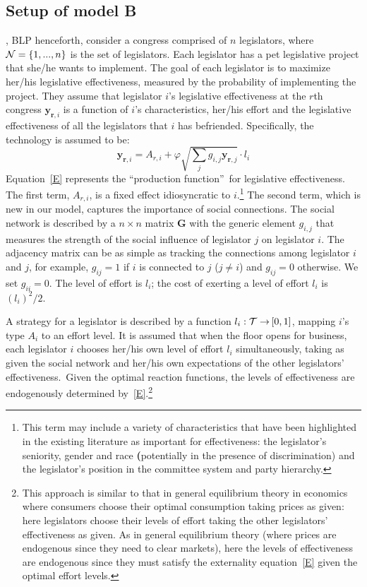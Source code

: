 \documentclass[nojss]{jss}
\begin{document}
\subsection{Setup of model B}\label{sec:modelB}

\cite{Battaglini+Sciabolazza+Patacchini:2020}, BLP henceforth, consider a congress comprised of $n$ legislators, where ${\cal N}=\{1,...,n\}$ is the set of legislators. Each legislator has a pet legislative project that she/he wants to implement. The goal of each legislator is to maximize her/his legislative effectiveness, measured by the probability of implementing the project. They assume that legislator $i$'s legislative effectiveness at the $r$th congress $\mathbf{y}_{\mathbf{r}, i}$ is a function of $i$'s characteristics, her/his effort and the legislative
effectiveness of all the legislators that $i$ has befriended. Specifically,
the technology is assumed to be:
\begin{equation}
	\mathbf{y}_{\mathbf{r}, i}=A_{r, i}+\varphi \sqrt{\sum_{j}g_{i,j}\mathbf{y}_{\mathbf{r}, j}}\cdot l_{i}
	\label{E}
\end{equation}
Equation~\ref{E} represents the \textquotedblleft production
function\textquotedblright\ for legislative effectiveness. The first term, $A_{r, i}$, is a fixed effect idiosyncratic to $i$.\footnote{This term may include a variety of characteristics that have been highlighted in the existing literature as important for effectiveness: the legislator's seniority, gender and race {\bf (}potentially in the presence of discrimination) and the legislator's position in the committee system and party hierarchy.} The second term, which is new in our model, captures
the importance of social connections. The social network is described by a $%
n\times n$ matrix $\boldsymbol{G}$ with the generic element $g_{i,j}$ that measures the
strength of the social influence of legislator $j$ on legislator $i$. The adjacency matrix can be as simple as tracking the connections among legislator $i$ and $j$, for example, $g_{ij}=1$ if $ i$ is connected to $j$ ($j\neq i$) and $g_{ij}=0$ otherwise. We set $g_{ii}=0$.
The level of effort is $l_{i}$; the cost of exerting a level of effort $l_{i}$
is $\left( l_{i}\right) ^{2}/2$.

A strategy for a legislator is described by a function $l_{i}:{\cal T\rightarrow }\left[ 0,1\right]$, mapping $i$'s type $A_{i}$ to an effort
level. It is assumed that when the floor opens for business, each legislator $i$ chooses her/his own level of effort $l_{i}$ simultaneously, taking as given the social network and her/his own expectations of the other legislators' effectiveness.\ Given the optimal reaction functions, the
levels of effectiveness are endogenously determined by~\ref{E}.\footnote{ This approach is similar to that in general equilibrium theory in economics
	where consumers choose their optimal consumption taking prices as given:
	here legislators choose their levels of effort taking the other legislators' effectiveness as given. As in general equilibrium theory (where prices are endogenous since they need to clear markets), here the levels of effectiveness are endogenous since they must satisfy the externality equation~\ref{E} given the optimal effort levels.} 
\end{document}
